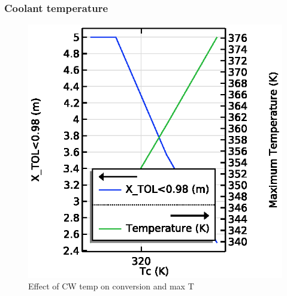 \subsubsection{Coolant temperature}

\begin{figure}[h]
    \centering
    \includegraphics[width=0.49\linewidth]{figures/S4-CW-X-T.eps}
    \caption{Effect of CW temp on conversion and max T}
    \label{fig:comsol-S4-CW-X-T}
\end{figure}
